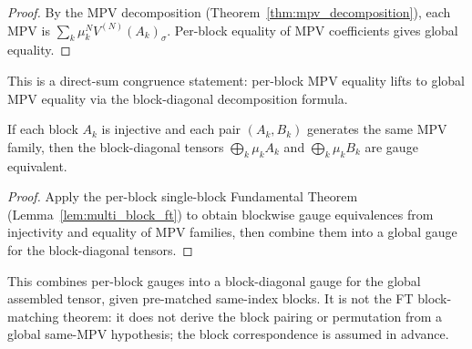 \begin{proof}\leanok{}
    By the MPV decomposition (Theorem~\ref{thm:mpv_decomposition}),
    each MPV is $\sum_k \mu_k^N V^{(N)}(A_k)_\sigma$.
    Per-block equality of MPV coefficients gives global equality.
\end{proof}

\begin{remark}
    This is a direct-sum congruence statement: per-block MPV equality lifts to
    global MPV equality via the block-diagonal decomposition formula.
\end{remark}

\begin{lemma}\label{lem:multi_block_global}
    \leanok
    If each block $A_k$ is injective and each pair $(A_k, B_k)$ generates
    the same MPV family, then the block-diagonal tensors
    $\bigoplus_k \mu_k A_k$ and $\bigoplus_k \mu_k B_k$ are gauge equivalent.
\end{lemma}

\begin{proof}\leanok{}
    Apply the per-block single-block Fundamental Theorem
    (Lemma~\ref{lem:multi_block_ft}) to obtain blockwise gauge
    equivalences from injectivity and equality of MPV families, then
    combine them into a global gauge for the block-diagonal tensors.
\end{proof}

\begin{remark}
    This combines per-block gauges into a block-diagonal gauge for the global
    assembled tensor, given pre-matched same-index blocks. It is not the FT
    block-matching theorem: it does not derive the block pairing or permutation
    from a global same-MPV hypothesis; the block correspondence is assumed in
    advance.
\end{remark}

